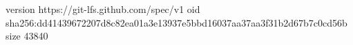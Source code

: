 version https://git-lfs.github.com/spec/v1
oid sha256:dd41439672207d8c82ea01a3e13937e5bbd16037aa37aa3f31b2d67b7c0cd56b
size 43840
